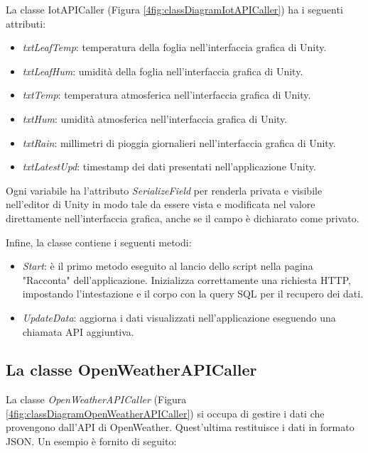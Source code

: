 La classe IotAPICaller (Figura \ref{4fig:classDiagramIotAPICaller}) ha i seguenti attributi:

\begin{itemize}
\item \textit{txtLeafTemp}: temperatura della foglia nell'interfaccia grafica di Unity.
\item \textit{txtLeafHum}: umidità della foglia nell'interfaccia grafica di Unity.
\item \textit{txtTemp}: temperatura atmosferica nell'interfaccia grafica di Unity.
\item \textit{txtHum}: umidità atmosferica nell'interfaccia grafica di Unity.
\item \textit{txtRain}: millimetri di pioggia giornalieri nell'interfaccia grafica di Unity.
\item \textit{txtLatestUpd}: timestamp dei dati presentati nell'applicazione Unity.
\end{itemize}

Ogni variabile ha l'attributo \textit{SerializeField} per renderla privata e visibile nell'editor di Unity in modo tale da essere vista e modificata nel valore direttamente nell'interfaccia grafica, anche se il campo è dichiarato come privato.

Infine, la classe contiene i seguenti metodi:

\begin{itemize}
    \item \textit{Start}: è il primo metodo eseguito al lancio dello script nella pagina "Racconta" dell'applicazione. Inizializza correttamente una richiesta HTTP, impostando l'intestazione e il corpo con la query SQL per il recupero dei dati.
    \item \textit{UpdateData}: aggiorna i dati visualizzati nell'applicazione eseguendo una chiamata API aggiuntiva.
\end{itemize}

\subsection{La classe OpenWeatherAPICaller}

La classe \textit{OpenWeatherAPICaller} (Figura \ref{4fig:classDiagramOpenWeatherAPICaller}) si occupa di gestire i dati che provengono dall'API di OpenWeather. Quest'ultima restituisce i dati in formato JSON. Un esempio è fornito di seguito:

